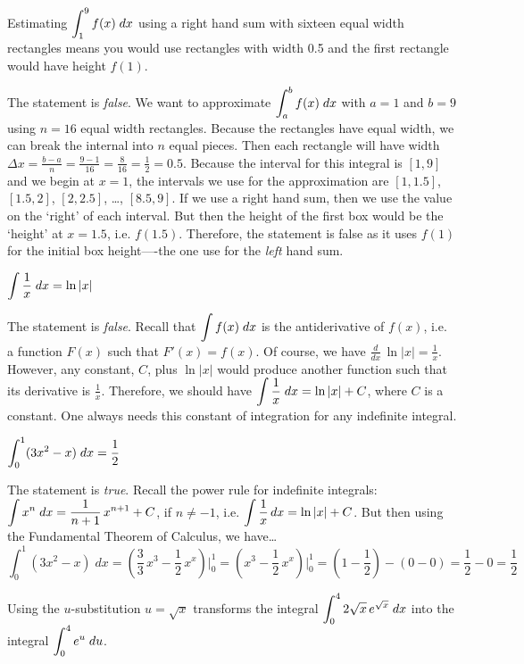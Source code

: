 \documentclass[11pt,letterpaper]{article}
\begin{document}
 Estimating $\displaystyle\int_1^9 f(x) \;dx$ using a right hand sum with sixteen equal width rectangles means you would use rectangles with width 0.5 and the first rectangle would have height $f(1)$. \pspace

\sol The statement is \textit{false}. We want to approximate $\displaystyle\int_a^b f(x) \;dx$ with $a= 1$ and $b= 9$ using $n= 16$ equal width rectangles. Because the rectangles have equal width, we can break the internal into $n$ equal pieces. Then each rectangle will have width $\Delta x= \frac{b - a}{n}= \frac{9 - 1}{16}= \frac{8}{16}= \frac{1}{2}= 0.5$. Because the interval for this integral is $[1, 9]$ and we begin at $x= 1$, the intervals we use for the approximation are $[1, 1.5]$, $[1.5, 2]$, $[2, 2.5]$, \dots, $[8.5, 9]$. If we use a right hand sum, then we use the value on the `right' of each interval. But then the height of the first box would be the `height' at $x= 1.5$, i.e. $f(1.5)$. Therefore, the statement is false as it uses $f(1)$ for the initial box height----the one use for the \textit{left} hand sum. \pvspace{1.3cm}



 $\displaystyle \int \dfrac{1}{x} \;dx= \ln|x|$ \pspace

\sol The statement is \textit{false}. Recall that $\displaystyle \int f(x) \;dx$ is the antiderivative of $f(x)$, i.e. a function $F(x)$ such that $F'(x)= f(x)$. Of course, we have $\frac{d}{dx} \, \ln|x|= \frac{1}{x}$. However, any constant, $C$, plus $\ln|x|$ would produce another function such that its derivative is $\frac{1}{x}$. Therefore, we should have $\displaystyle \int \frac{1}{x} \; dx= \ln|x| + C$, where $C$ is a constant. One always needs this constant of integration for any indefinite integral. \pvspace{1.3cm}



 $\displaystyle\int_0^1 (3x^2 - x) \;dx= \dfrac{1}{2}$ \pspace

\sol The statement is \textit{true}. Recall the power rule for indefinite integrals: $\displaystyle\int x^n \;dx= \frac{1}{n + 1}\, x^{n+1} + C$, if $n \neq -1$, i.e. $\displaystyle\int \dfrac{1}{x} \,dx= \ln|x| + C$. But then using the Fundamental Theorem of Calculus, we have\dots
	\[
	\int_0^1 (3x^2 - x) \;dx= \left( \dfrac{3}{3} \, x^3 - \dfrac{1}{2}\, x^x \right) \bigg|_0^1= \left( x^3 - \dfrac{1}{2}\, x^x \right) \bigg|_0^1= \left(1 - \dfrac{1}{2} \right) - (0 - 0)= \dfrac{1}{2} - 0= \dfrac{1}{2}
	\] \pvspace{1.3cm}



 Using the $u$-substitution $u= \sqrt{x}$ transforms the integral $\displaystyle\int_0^4 2 \sqrt{x} \, e^{\sqrt{x}} \;dx$ into the integral $\displaystyle\int_0^4 e^u \;du$. \pspace 
\end{document}
